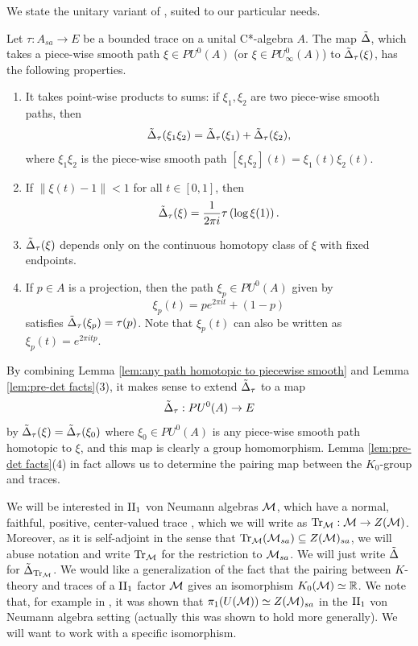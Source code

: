 \documentclass{amsart}
\begin{document}
We state the unitary variant of \cite[Lemme 1]{dlHS84a}, suited to our particular needs.

\begin{lemma}\label{lem:pre-det facts}
Let $\tau: A_{sa} \to E$ be a bounded trace on a unital C*-algebra $A$. The map $\tilde{\Delta}$, which takes a piece-wise smooth path $\xi \in PU^0(A)$ (or $\xi \in PU_{\infty}^0(A)$) to $\tilde{\Delta}_\tau(\xi)$, has the following properties.
\begin{enumerate}
\item It takes point-wise products to sums: if $\xi_1,\xi_2$ are two piece-wise smooth paths, then
\begin{equation}
\tilde{\Delta}_\tau(\xi_1\xi_2) = \tilde{\Delta}_\tau(\xi_1) + \tilde{\Delta}_\tau(\xi_2),
\end{equation}
where $\xi_1\xi_2$ is the piece-wise smooth path $[\xi_1\xi_2](t) = \xi_1(t)\xi_2(t)$. 
\item If $\|\xi(t) - 1\| < 1$ for all $t \in [0,1]$, then
\begin{equation}
\tilde{\Delta}_\tau(\xi) = \frac{1}{2\pi i}\tau\left(\log \xi(1)\right).
\end{equation}
\item $\tilde{\Delta}_\tau(\xi)$ depends only on the continuous homotopy class of $\xi$ with fixed endpoints.
\item If $p \in A$ is a projection, then the path $\xi_p \in PU^0(A)$ given by
\begin{equation}
\xi_p(t) = pe^{2\pi i t} + (1-p)
\end{equation}
satisfies $\tilde{\Delta}_\tau(\xi_p) = \tau(p)$. Note that $\xi_p(t)$ can also be written as $\xi_p(t) = e^{2\pi i tp}$. 
\end{enumerate}
\end{lemma}

By combining Lemma \ref{lem:any path homotopic to piecewise smooth} and Lemma \ref{lem:pre-det facts}(3), it makes sense to extend $\tilde{\Delta}_\tau$ to a map
\begin{equation}
\tilde{\Delta}_\tau: PU^0(A) \to E
\end{equation}
by $\tilde{\Delta}_\tau(\xi) = \tilde{\Delta}_\tau(\xi_0)$ where $\xi_0 \in PU^0(A)$ is any piece-wise smooth path homotopic to $\xi$, and this map is clearly a group homomorphism. 
Lemma \ref{lem:pre-det facts}(4) in fact allows us to determine the pairing map between the $K_0$-group and traces.

We will be interested in $\text{II}_1$ von Neumann algebras $\mathcal{M}$, which have a normal, faithful, positive, center-valued trace \cite[Theorem V.2.6]{TakesakiI}, which we will write as $\text{Tr}_{\mathcal{M}}: \mathcal{M} \to Z(\mathcal{M})$. Moreover, as it is self-adjoint in the sense that $\text{Tr}_{\mathcal{M}}(\mathcal{M}_{sa}) \subseteq Z(\mathcal{M})_{sa}$, we will abuse notation and write $\text{Tr}_{\mathcal{M}}$ for the restriction to $\mathcal{M}_{sa}$. We will just write $\tilde{\Delta}$ for $\tilde{\Delta}_{\text{Tr}_{\mathcal{M}}}$.
We would like a generalization of the fact that the pairing between $K$-theory and traces of a $\text{II}_1$ factor $\mathcal{M}$ gives an isomorphism $K_0(\mathcal{M}) \simeq \mathbb{R}$.
We note that, for example in \cite{Handelman78}, it was shown that $\pi_1(U(\mathcal{M})) \simeq Z(\mathcal{M})_{sa}$ in the $\text{II}_1$ von Neumann algebra setting (actually this was shown to hold more generally). We will want to work with a specific isomorphism.
\end{document}

